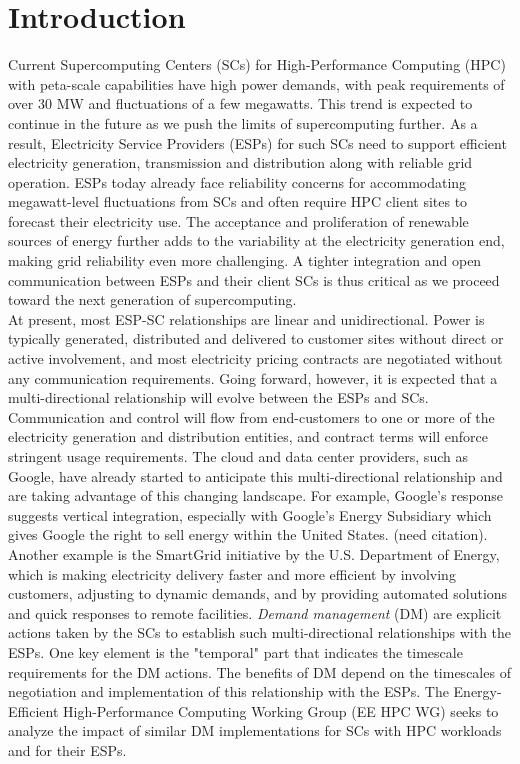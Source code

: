 \section{Introduction}

Current Supercomputing Centers (SCs) for High-Performance Computing (HPC) with peta-scale capabilities have high power demands, with peak requirements of over 30 MW and fluctuations of a few megawatts. This trend is expected to continue in the future as we push the limits of supercomputing further. As a result, Electricity Service Providers (ESPs) for such SCs need to support efficient electricity generation, transmission and distribution along with reliable grid operation. ESPs today already face reliability concerns for accommodating megawatt-level fluctuations from SCs and often require HPC client sites to forecast their electricity use. The acceptance and proliferation of renewable sources of energy further adds to the variability at the electricity generation end, making grid reliability even more challenging. A tighter integration and open communication between ESPs and their client SCs is thus critical as we proceed toward the next generation of supercomputing. \\

At present, most ESP-SC relationships are linear and unidirectional. Power is typically generated, distributed and delivered to customer sites without direct or active involvement, and most electricity pricing contracts are negotiated without any communication requirements. Going forward, however, it is expected that a multi-directional relationship will evolve between the ESPs and SCs.  Communication and control will flow from end-customers to one or more of the electricity generation and distribution entities, and contract terms will enforce stringent usage requirements. The cloud and data center providers, such as Google, have already started to anticipate this multi-directional relationship and are taking advantage of this changing landscape.  For example, Google's response suggests vertical integration, especially with Google's Energy Subsidiary which gives Google the right to sell energy within the United States. (need citation). Another example is the SmartGrid initiative \cite{SmartGrid} by the U.S. Department of Energy, which is making electricity delivery faster and more efficient by involving customers, adjusting to dynamic demands, and by providing automated solutions and quick responses to remote facilities. \emph{Demand management} (DM) are explicit actions taken by the SCs to establish such multi-directional relationships with the ESPs. One key element is the "temporal" part that indicates the timescale requirements for the DM actions. The benefits of DM depend on the timescales of negotiation and implementation of this relationship with the ESPs. The Energy-Efficient High-Performance Computing Working Group (EE HPC WG) seeks to analyze the impact of similar DM implementations for SCs with HPC workloads and for their ESPs. \\

